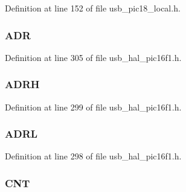 Definition at line 152 of file usb\+\_\+pic18\+\_\+local.\+h.

\hypertarget{union_____b_d_t_a9ff8e0fbc95a686640894b480a1ce71f}{}
\subsubsection[{A\+D\+R}]{ A\+D\+R}\label{union_____b_d_t_a9ff8e0fbc95a686640894b480a1ce71f}


Definition at line 305 of file usb\+\_\+hal\+\_\+pic16f1.\+h.

\hypertarget{union_____b_d_t_a6a7af362f9570b9847cb9df593fe49d3}{}
\subsubsection[{A\+D\+R\+H}]{ A\+D\+R\+H}\label{union_____b_d_t_a6a7af362f9570b9847cb9df593fe49d3}


Definition at line 299 of file usb\+\_\+hal\+\_\+pic16f1.\+h.

\hypertarget{union_____b_d_t_aed7cec86ac74d18c84b2a992136bd01d}{}
\subsubsection[{A\+D\+R\+L}]{ A\+D\+R\+L}\label{union_____b_d_t_aed7cec86ac74d18c84b2a992136bd01d}


Definition at line 298 of file usb\+\_\+hal\+\_\+pic16f1.\+h.

\hypertarget{union_____b_d_t_aa47496fdbb315cdb40ee4b6a18fe21c4}{}
\subsubsection[{C\+N\+T}]{ C\+N\+T}\label{union_____b_d_t_aa47496fdbb315cdb40ee4b6a18fe21c4}


